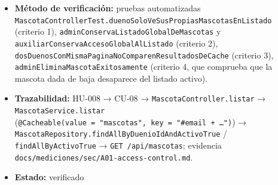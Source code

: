 \documentclass[
  spanish,
]{article}
\providecommand{\tightlist}{%
  \setlength{\itemsep}{0pt}\setlength{\parskip}{0pt}}
\begin{document}
\begin{itemize}
  \begin{enumerate}
  \def\labelenumi{\arabic{enumi}.}
  \tightlist
  \item
    Dado un usuario \texttt{ROLE\_\allowbreak{}DUENO} con mascotas propias y
    existiendo mascotas de otro dueño, cuando invoca
    \texttt{GET\ /\allowbreak{}api/\allowbreak{}mascotas}, entonces la respuesta es
    \texttt{200\ OK} y contiene exclusivamente sus mascotas: ninguna
    mascota de otro dueño aparece en la página.
  \item
    Dado un usuario \texttt{ROLE\_\allowbreak{}ADMIN} o \texttt{ROLE\_\allowbreak{}AUXILIAR},
    cuando invoca el mismo endpoint, entonces el listado incluye las
    mascotas activas de todos los dueños.
  \item
    Dadas dos cuentas \texttt{ROLE\_\allowbreak{}DUENO} distintas que solicitan la
    misma página con los mismos parámetros de paginación, entonces cada
    una recibe únicamente sus propios datos: la caché no comparte
    resultados entre usuarios.
  \item
    Las mascotas con \texttt{activo\ =\ false} no aparecen en el
    listado.
  \end{enumerate}
\item
  \textbf{Método de verificación:} pruebas automatizadas
  \texttt{Mascota\allowbreak{}Controller\allowbreak{}Test.\allowbreak{}dueno\allowbreak{}Solo\allowbreak{}Ve\allowbreak{}Sus\allowbreak{}Propias\allowbreak{}Mascotas\allowbreak{}En\allowbreak{}Listado}
  (criterio 1), \texttt{admin\allowbreak{}Conserva\allowbreak{}Listado\allowbreak{}Global\allowbreak{}De\allowbreak{}Mascotas} y
  \texttt{auxiliar\allowbreak{}Conserva\allowbreak{}Acceso\allowbreak{}Global\allowbreak{}Al\allowbreak{}Listado} (criterio 2),
  \texttt{dos\allowbreak{}Duenos\allowbreak{}Con\allowbreak{}Misma\allowbreak{}Pagina\allowbreak{}No\allowbreak{}Comparen\allowbreak{}Resultados\allowbreak{}De\allowbreak{}Cache} (criterio
  3), \texttt{admin\allowbreak{}Elimina\allowbreak{}Mascota\allowbreak{}Exitosamente} (criterio 4, que
  comprueba que la mascota dada de baja desaparece del listado activo).
\item
  \textbf{Trazabilidad:} HU-008 → CU-08 →
  \texttt{Mascota\allowbreak{}Controller.\allowbreak{}listar} → \texttt{Mascota\allowbreak{}Service.\allowbreak{}listar}
  (\texttt{@Cacheable(value\ =\ "\allowbreak{}mascotas",\allowbreak{}\ key\ =\ "\#email\ +\ …")})
  → \texttt{Mascota\allowbreak{}Repository.\allowbreak{}find\allowbreak{}All\allowbreak{}By\allowbreak{}Duenio\allowbreak{}Id\allowbreak{}And\allowbreak{}Activo\allowbreak{}True} /
  \texttt{find\allowbreak{}All\allowbreak{}By\allowbreak{}Activo\allowbreak{}True} → \texttt{GET\ /\allowbreak{}api/\allowbreak{}mascotas}; evidencia
  \texttt{docs/\allowbreak{}mediciones/\allowbreak{}sec/\allowbreak{}A01-\allowbreak{}access-\allowbreak{}control.\allowbreak{}md}.
\item
  \textbf{Estado:} verificado
\end{itemize}
\end{document}
